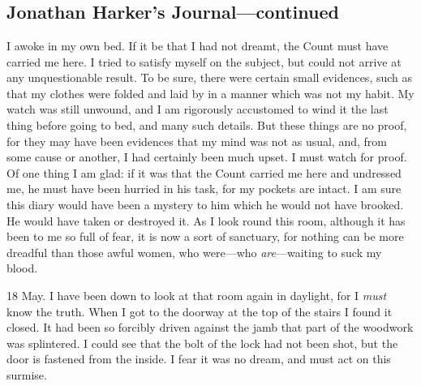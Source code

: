 \chapter[Chapter \thechapter]{}

\section{Jonathan Harker's Journal—continued}
	
I awoke in my own bed. If it be that I had not dreamt, the Count must have carried me here. I tried to satisfy myself on the subject, but could not arrive at any unquestionable result. To be sure, there were certain small evidences, such as that my clothes were folded and laid by in a manner which was not my habit. My watch was still unwound, and I am rigorously accustomed to wind it the last thing before going to bed, and many such details. But these things are no proof, for they may have been evidences that my mind was not as usual, and, from some cause or another, I had certainly been much upset. I must watch for proof. Of one thing I am glad: if it was that the Count carried me here and undressed me, he must have been hurried in his task, for my pockets are intact. I am sure this diary would have been a mystery to him which he would not have brooked. He would have taken or destroyed it. As I look round this room, although it has been to me so full of fear, it is now a sort of sanctuary, for nothing can be more dreadful than those awful women, who were—who \textit{are}—waiting to suck my blood.

 
\begin{diary}{18 May.}
I have been down to look at that room again in daylight, for I \textit{must} know the truth. When I got to the doorway at the top of the stairs I found it closed. It had been so forcibly driven against the jamb that part of the woodwork was splintered. I could see that the bolt of the lock had not been shot, but the door is fastened from the inside. I fear it was no dream, and must act on this surmise.
\end{diary}
 
